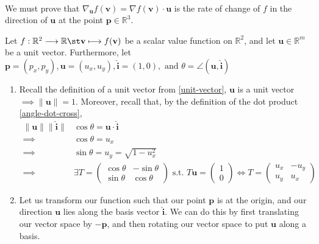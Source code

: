 \documentclass[12pt]{book}
\makeatletter
\newcommand{\rbb}{\mathbb{R}}
\theoremstyle{definitionstyle}
\renewenvironment{proof}[1][\proofname]{\par
  \pushQED{\qed}%
  \normalfont \topsep6\p@\@plus6\p@\relax
  \trivlist
  \item[\hskip\labelsep
		\bfseries
	#1\@addpunct{.}]\ignorespaces
}{
  \popQED\endtrivlist\@endpefalse
}
\numberwithin{equation}{section}
\makeatother
\begin{document}
\begin{proof}[Proof of Theorem \ref{directional-derivative-thm} for scalar value functions on $\rbb^2$]
    \noindent \\
    We must prove that $\nabla_\mathbf{u} f(\mathbf{v}) = \nabla f(\mathbf{v}) \cdot \mathbf{u}$ is the rate of change of $f$ in the direction of $\mathbf{u}$ at the point $\mathbf{p} \in \rbb^{3}$.

    Let $\func[\mathbf{v}][f(\mathbf{v})]{f}{\rbb^2}{\rbb}$ be a scalar value function on $\rbb^2$, and let $\mathbf{u} \in \rbb^m$ be a unit vector. Furthermore, let $\mathbf{p}=(p_x, p_y), \mathbf{u} = (u_x,u_y),\mathbf{\hat{i}} = (1,0), \text{ and } \theta = \angle(\mathbf{u},\mathbf{\hat{i}})$

    \begin{enumerate}
	\item Recall the definition of a unit vector from \ref{unit-vector}, $\mathbf{u}$ is a unit vector $\implies \|\mathbf{u}\| = 1$. Moreover, recall that, by the definition of the dot product \ref{angle-dot-cross},
		  \begin{equation}
		      \begin{split}
			  \|\mathbf{u}\|\|\mathbf{\hat{i}}\| & \cos{\theta} = \mathbf{u} \cdot \mathbf{\hat{i}} \\
			  \implies & \cos{\theta} = u_x \\
			  \implies & \sin{\theta} = u_y = \sqrt{1 - u^2_x} \\
			  \implies & \exists T=\begin{pmatrix} \cos{\theta} & -\sin{\theta} \\ \sin{\theta} & \cos{\theta} \end{pmatrix} \text{ s.t. } T\mathbf{u} = \begin{pmatrix} 1 \\ 0 \end{pmatrix} \iff T=\begin{pmatrix} u_x & -u_y \\ u_y & u_x \end{pmatrix}
		      \end{split}
		  \end{equation}
	      \item Let us transform our function such that our point $\mathbf{p}$ is at the origin, and our direction $\mathbf{u}$ lies along the basis vector $\mathbf{\hat{i}}$. We can do this by first translating our vector space by $-\mathbf{p}$, and then rotating our vector space to put $\mathbf{u}$ along a basis.
	

\end{enumerate}
\end{proof}
\end{document}
